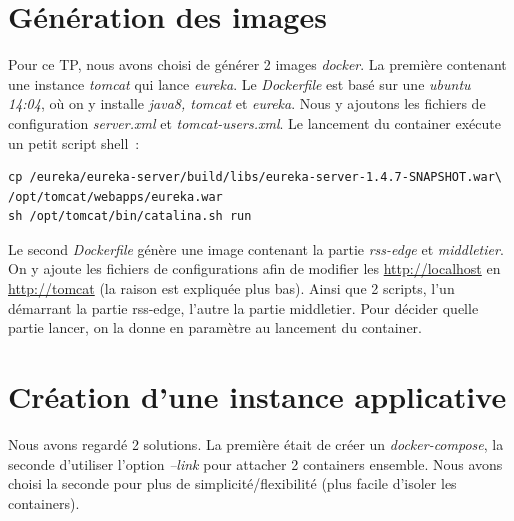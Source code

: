 \documentclass{article}
\begin{document}
	\section{Génération des images}
	Pour ce TP, nous avons choisi de générer 2 images \emph{docker}. La première contenant une instance \emph{tomcat} qui lance \emph{eureka}. Le \emph{Dockerfile} est basé sur une \emph{ubuntu 14:04}, où on y installe \emph{java8, tomcat} et \emph{eureka}. Nous y ajoutons les fichiers de configuration \emph{server.xml} et \emph{tomcat-users.xml}. Le lancement du container exécute un petit script shell~:
	\begin{verbatim}
cp /eureka/eureka-server/build/libs/eureka-server-1.4.7-SNAPSHOT.war\
/opt/tomcat/webapps/eureka.war
sh /opt/tomcat/bin/catalina.sh run
	\end{verbatim}
	Le second \emph{Dockerfile} génère une image contenant la partie \emph{rss-edge} et \emph{middletier}. On y ajoute les fichiers de configurations afin de modifier les \url{http://localhost} en \url{http://tomcat} (la raison est expliquée plus bas). Ainsi que 2 scripts, l'un démarrant la partie rss-edge, l'autre la partie middletier. Pour décider quelle partie lancer, on la donne en paramètre au lancement du container.
	\section{Création d'une instance applicative}
	Nous avons regardé 2 solutions. La première était de créer un \emph{docker-compose}, la seconde d'utiliser l'option \emph{--link} pour attacher 2 containers ensemble. Nous avons choisi la seconde pour plus de simplicité/flexibilité (plus facile d'isoler les containers).
\end{document}
